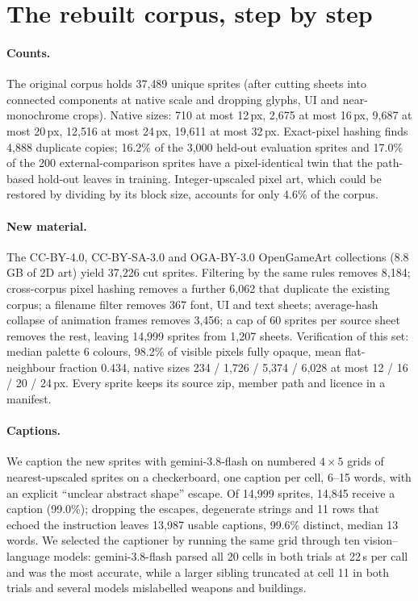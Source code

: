 
\section{The rebuilt corpus, step by step}
\label{app:data}

\paragraph{Counts.}
The original corpus holds 37{,}489 unique sprites (after cutting sheets into connected components at native scale and
dropping glyphs, UI and near-monochrome crops). Native sizes: 710 at most 12\,px, 2{,}675 at most 16\,px, 9{,}687 at
most 20\,px, 12{,}516 at most 24\,px, 19{,}611 at most 32\,px. Exact-pixel hashing finds 4{,}888 duplicate copies;
16.2\% of the 3{,}000 held-out evaluation sprites and 17.0\% of the 200 external-comparison sprites have a
pixel-identical twin that the path-based hold-out leaves in training. Integer-upscaled pixel art, which could be
restored by dividing by its block size, accounts for only 4.6\% of the corpus.

\paragraph{New material.}
The CC-BY-4.0, CC-BY-SA-3.0 and OGA-BY-3.0 OpenGameArt collections (8.8\,GB of 2D art) yield 37{,}226 cut sprites.
Filtering by the same rules removes 8{,}184; cross-corpus pixel hashing removes a further 6{,}062 that duplicate the
existing corpus; a filename filter removes 367 font, UI and text sheets; average-hash collapse of animation frames
removes 3{,}456; a cap of 60 sprites per source sheet removes the rest, leaving 14{,}999 sprites from 1{,}207 sheets.
Verification of this set: median palette 6 colours, 98.2\% of visible pixels fully opaque, mean flat-neighbour fraction
0.434, native sizes 234 / 1{,}726 / 5{,}374 / 6{,}028 at most 12 / 16 / 20 / 24\,px. Every sprite keeps its source zip,
member path and licence in a manifest.

\paragraph{Captions.}
We caption the new sprites with gemini-3.8-flash on numbered $4\times5$ grids of nearest-upscaled sprites on a
checkerboard, one caption per cell, 6--15 words, with an explicit ``unclear abstract shape'' escape. Of 14{,}999
sprites, 14{,}845 receive a caption (99.0\%); dropping the escapes, degenerate strings and 11 rows that echoed the
instruction leaves 13{,}987 usable captions, 99.6\% distinct, median 13 words. We selected the captioner by running the
same grid through ten vision--language models: gemini-3.8-flash parsed all 20 cells in both trials at 22\,s per call and
was the most accurate, while a larger sibling truncated at cell 11 in both trials and several models mislabelled
weapons and buildings.

